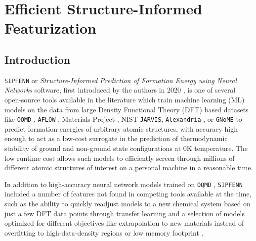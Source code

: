 
\chapter{Efficient Structure-Informed Featurization}

\section{Introduction} \label{sec:Introduction}

\texttt{SIPFENN} or \textit{Structure-Informed Prediction of Formation Energy using Neural Networks} software, first introduced by the authors in 2020 \cite{Krajewski2022ExtensibleNetworks, Krajewski2020SIPFENNModels}, is one of several open-source tools available in the literature \cite{Ward2017, Jha2019IRNet, Chen2019GraphCrystals, Choudhary2021AtomisticPredictions, Deng2023CHGNetModelling, Davariashtiyani2023FormationRepresentation, Davariashtiyani2023FormationRepresentation, Schmidt2023Machine-Learning-AssistedMaterials} which train machine learning (ML) models on the data from large Density Functional Theory (DFT) based datasets like \texttt{OQMD} \cite{Saal2013MaterialsOQMD, Kirklin2015TheEnergies, Shen2022ReflectionsOQMD}, \texttt{AFLOW} \cite{Curtarolo2013AFLOW:Discovery, Toher2018TheDiscovery}, Materials Project \cite{Jain2013Commentary:Innovation}, NIST-\texttt{JARVIS}\cite{Choudhary2020TheDesign}, \texttt{Alexandria} \cite{Schmidt2022AFunctionals}, or \texttt{GNoME} \cite{Merchant2023ScalingDiscovery} to predict formation energies of arbitrary atomic structures, with accuracy high enough to act as a low-cost surrogate in the prediction of thermodynamic stability of ground and non-ground state configurations at 0K temperature. The low runtime cost allows such models to efficiently screen through millions of different atomic structures of interest on a personal machine in a reasonable time. 

In addition to high-accuracy neural network models trained on \texttt{OQMD} \cite{Saal2013MaterialsOQMD, Kirklin2015TheEnergies, Shen2022ReflectionsOQMD}, \texttt{SIPFENN} included a number of features not found in competing tools available at the time, such as the ability to quickly readjust models to a new chemical system based on just a few DFT data points through transfer learning and a selection of models optimized for different objectives like extrapolation to new materials instead of overfitting to high-data-density regions or low memory footprint \cite{Krajewski2022ExtensibleNetworks}.

